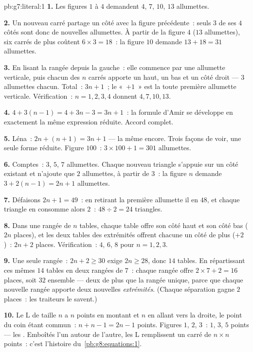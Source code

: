 \begin{solution}{pb:g7:literal:1}
\textbf{1.} Les figures $1$ à $4$ demandent $4$, $7$, $10$, $13$
allumettes.

\textbf{2.} Un nouveau carré partage un côté avec la figure
précédente~: seuls $3$ de ses $4$ côtés sont donc de nouvelles
allumettes. À partir de la figure $4$ ($13$ allumettes), six carrés
de plus coûtent $6 \times 3 = 18$~: la figure $10$ demande
$13 + 18 = 31$ allumettes.

\textbf{3.} En lisant la rangée depuis la gauche~: elle commence par
une allumette verticale, puis chacun des $n$ carrés apporte un haut,
un bas et un côté droit --- $3$ allumettes chacun. Total~: $3n + 1$~;
le «~$+1$~» est la toute première allumette verticale. Vérification~:
$n = 1, 2, 3, 4$ donnent $4, 7, 10, 13$.

\textbf{4.} $4 + 3(n - 1) = 4 + 3n - 3 = 3n + 1$~: la formule
d'Amir se développe en exactement la même expression réduite.
Accord complet.

\textbf{5.} Léna~: $2n + (n + 1) = 3n + 1$ --- la même encore. Trois
façons de voir, une seule forme réduite. Figure $100$~:
$3 \times 100 + 1 = 301$ allumettes.

\textbf{6.} Comptes~: $3$, $5$, $7$ allumettes. Chaque nouveau
triangle s'appuie sur un côté existant et n'ajoute que $2$
allumettes, à partir de $3$~: la figure $n$ demande
$3 + 2(n - 1) = 2n + 1$ allumettes.

\textbf{7.} Défaisons $2n + 1 = 49$~: en retirant la première
allumette il en  $48$, et chaque triangle en consomme alors
$2$~: $48 \div 2 = 24$ triangles.

\textbf{8.} Dans une rangée de $n$ tables, chaque table offre son
côté haut et son côté bas ($2n$ places), et les deux tables des
extrémités offrent chacune un côté de plus ($+2$)~: $2n + 2$ places.
Vérification~: $4$, $6$, $8$ pour $n = 1, 2, 3$.

\textbf{9.} Une seule rangée~: $2n + 2 \geq 30$ exige
$2n \geq 28$, donc $14$ tables. En répartissant ces mêmes $14$
tables en deux rangées de $7$~: chaque rangée offre
$2 \times 7 + 2 = 16$ places, soit $32$ ensemble --- deux de plus
que la rangée unique, parce que chaque nouvelle rangée apporte deux
nouvelles \emph{extrémités}. (Chaque séparation gagne $2$ places~:
les traiteurs le savent.)

\textbf{10.} Le L de taille $n$ a $n$ points en montant et $n$ en
allant vers la droite, le point du coin étant commun~:
$n + n - 1 = 2n - 1$ points. Figures $1$, $2$, $3$~: $1$, $3$, $5$
points --- les \emph{}. Emboîtés l'un autour de
l'autre, les L remplissent un carré de $n \times n$ points~: c'est
l'histoire du~\cref{pb:g8:equations:1}.


\end{solution}
